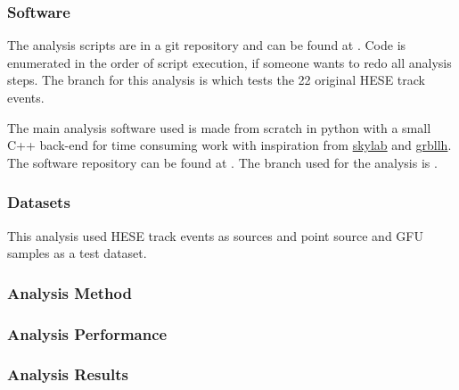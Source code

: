 \section{Software}
The analysis scripts are in a git repository and can be found at .
Code is enumerated in the order of script execution, if someone wants to redo all analysis steps.
The branch for this analysis is  which tests the 22 original HESE track events.

The main analysis software used is made from scratch in python with a small C++ back-end for time consuming work with inspiration from \href{http://code.icecube.wisc.edu/projects/icecube/browser/IceCube/sandbox/skylab}{skylab} and \href{http://code.icecube.wisc.edu/projects/icecube/browser/IceCube/sandbox/richman/grbllh}{grbllh}.
The software repository can be found at .
The branch used for the analysis is .

\section{Datasets}
This analysis used HESE track events as sources and point source and GFU samples as a test dataset.

\section{Analysis Method}

\section{Analysis Performance}

\section{Analysis Results}


\appendix
\part*{\appendixname}
